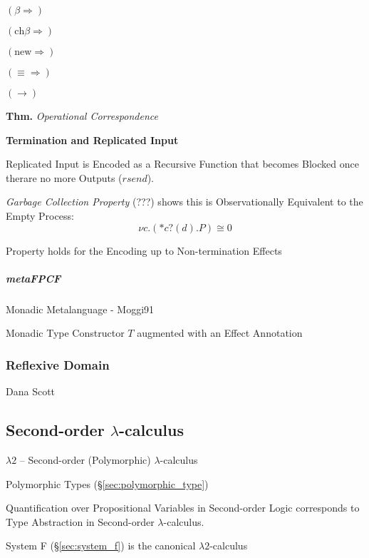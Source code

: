 $(\beta\Rightarrow)$

$(\text{ch}\beta\Rightarrow)$

$(\text{new}\Rightarrow)$

$(\equiv\Rightarrow)$

$(\rightarrow)$

\textbf{Thm.} \emph{Operational Correspondence}


\textbf{Termination and Replicated Input}

Replicated Input is Encoded as a Recursive Function that becomes
Blocked once therare no more Outputs ($rsend$).

\emph{Garbage Collection Property} (???) shows this is Observationally
Equivalent to the Empty Process:
\[
  \nu c.(*c?(d).P) \cong 0
\]

Property holds for the Encoding up to Non-termination Effects %



\subparagraph{metaFPCF}\label{sec:meta_fpcf}\hfill

\cite{orchard-yoshida16}

Monadic Metalanguage - Moggi91 %

Monadic Type Constructor $T$ augmented with an Effect Annotation
\cite{wadler-thiemann03}



\subsubsection{Reflexive Domain}\label{sec:reflexive_domain}

Dana Scott %



\subsection{Second-order $\lambda$-calculus}
\label{sec:secondorder_lambda}

$\lambda2$ -- Second-order (Polymorphic) $\lambda$-calculus

Polymorphic Types (\S\ref{sec:polymorphic_type})

Quantification over Propositional Variables in Second-order Logic
corresponds to Type Abstraction in Second-order $\lambda$-calculus.
\cite{wadler14}

System F (\S\ref{sec:system_f}) is the canonical $\lambda2$-calculus


